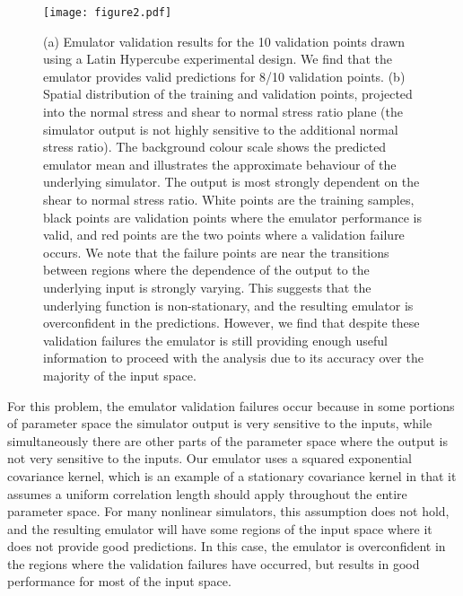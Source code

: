 \documentclass[openacc]{rstransa}%
\begin{document}
\begin{figure}[!h]
\centering\texttt{[image: figure2.pdf]}
\caption{(a) Emulator validation results for the 10 validation points
  drawn using a Latin Hypercube experimental design. We find that the
  emulator provides valid predictions for 8/10 validation points.
  (b) Spatial distribution of the training and validation points, projected
  into the normal stress and shear to normal stress ratio plane (the
  simulator output is not highly sensitive to the additional normal
  stress ratio).
  The background colour scale shows the predicted emulator mean and
  illustrates the
  approximate behaviour of the underlying simulator. The output is
  most strongly dependent on the shear to normal stress ratio. White
  points are the training samples, black points are validation points
  where the emulator performance is valid, and red points are the two
  points where a validation failure occurs. We note that the failure
  points are near the transitions between regions where the dependence
  of the output to the underlying input is strongly varying. This suggests
  that the underlying function is non-stationary, and the resulting
  emulator is overconfident in the predictions. However, we find that despite
  these validation failures the emulator is still providing enough useful
  information to proceed with the analysis due to its accuracy over
  the majority of the input space.}
\label{fig_valid}
\end{figure}

For this problem, the emulator validation failures occur because
in some portions of parameter space the simulator output
is very sensitive to the inputs, while simultaneously there are other
parts of the parameter space where the output is not very sensitive to
the inputs. Our emulator uses a squared exponential covariance kernel, which
is an example of a stationary covariance kernel in that it assumes a uniform
correlation length should apply throughout the entire parameter space.
For many nonlinear simulators, this assumption does not hold, and the resulting
emulator will have some regions of the input space where it does not
provide good predictions. In this case, the emulator is overconfident in
the regions where the validation failures have occurred, but results in good
performance for most of the input space.
\end{document}
